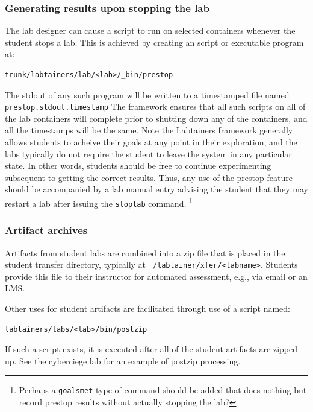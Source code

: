 \documentclass[12pt]{article}
\begin{document}
\subsubsection{Generating results upon stopping the lab}
The lab designer can cause a script to run on selected containers whenever the student stops a lab.
This is achieved by creating an script or executable program at:
\begin{verbatim}
trunk/labtainers/lab/<lab>/_bin/prestop
\end{verbatim}
The stdout of any such program will be written to a timestamped file named {\tt prestop.stdout.timestamp}
The framework ensures that all such scripts on all of the lab containers will complete prior to
shutting down any of the containers, and all the timestamps
will be the same.  Note the Labtainers framework generally allows students to acheive their goals at any
point in their exploration, and the labs typically do not require the student to leave the system in any
particular state.  In other words, students should be free to continue experimenting subsequent to getting
the correct results.  Thus, any use of the prestop feature should be accompanied by a lab manual entry
advising the student that they may restart a lab after issuing the {\tt stoplab} command. \footnote{Perhaps a
{\tt goalsmet} type of command should be added that does nothing but record prestop results without actually
stopping the lab?}

\subsubsection{Artifact archives}
Artifacts from student labs are combined into a zip file that is placed in the student transfer
directory, typically at {\tt ~/labtainer/xfer/<labname>}.  Students provide this file to their
instructor for automated assessment, e.g., via email or an LMS.  

Other uses for student artifacts are facilitated through use of a script named:
\begin{verbatim}
labtainers/labs/<lab>/bin/postzip
\end{verbatim}
\noindent If such a script exists, it is executed after all of the student artifacts are zipped up.  See
the cyberciege lab for an example of postzip processing.
\end{document}
